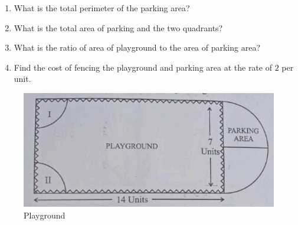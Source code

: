 \begin{enumerate}
            \begin{enumerate}
                \item What is the total perimeter of the parking area?
                \item What is the total area of parking and the two quadrants?
                \item What is the ratio of area of playground to the area of parking area?
                \item Find the cost of fencing the playground and parking area at the rate of \rupee $2$ per unit.
            \end{enumerate}
    \begin{figure}[!ht]
        \centering
        \includegraphics[width=\columnwidth]{figs/30-4-3-question36.png}
        \caption{Playground}
        \label{fig:enter-label2}
    \end{figure}
\end{enumerate}
%
